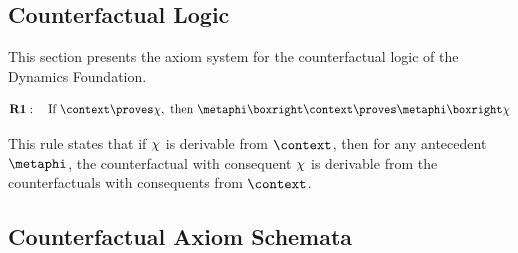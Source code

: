 \documentclass[../LogosReference.tex]{subfiles}
\begin{document}

\subsection{Counterfactual Logic}\label{sec:counterfactual-axioms}

This section presents the axiom system for the counterfactual logic of the Dynamics Foundation.


\begin{definition}\label{def:closure-deduction}
	\[
		\textbf{R1}: \quad \text{If } \context \proves \metaC, \text{ then } \metaphi \boxright \context \proves \metaphi \boxright \metaC
	\]
\end{definition}

\begin{remark}
	This rule states that if $\chi$ is derivable from $\context$, then for any antecedent $\metaphi$, the counterfactual with consequent $\chi$ is derivable from the counterfactuals with consequents from $\context$.
\end{remark}


\subsection{Counterfactual Axiom Schemata}\label{sec:counterfactual-axioms}
\end{document}
